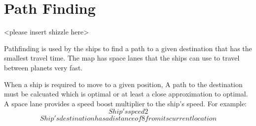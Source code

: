 \section{Path Finding}
<please insert shizzle here>
\begin{comment}

what pathfinding is
what it's used by (ships)
how navigation works on a map with planets and space lanes.

optimal path:
- A*
making the ship follow path more naturally:
- bezier
- fluid flow
\end{comment}

Pathfinding is used by the ships to find a path to a given destination that has the smallest travel time.
The map has space lanes that the ships can use to travel between planets very fast.

When a ship is required to move to a given position, A path to the destination must be calcuated which is optimal or at least a close approximation to optimal.
A space lane provides a speed boost multiplier to the ship's speed. For example:
$$ Ship's speed 2 $$
$$ Ship's destination has a distance of 8 from its current location $$
